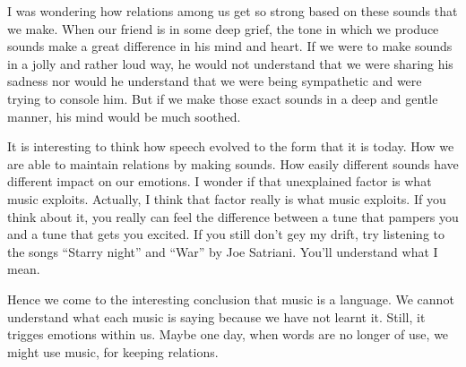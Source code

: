 \documentclass[twoside,11pt]{article}
\begin{document}
I was wondering how relations among us get so strong based on these sounds that we make. When our friend is in some deep grief, the tone in which we produce sounds make a great difference in his mind and heart. If we were to make sounds in a jolly and rather loud way, he would not understand that we were sharing his sadness nor would he understand that we were being sympathetic and were trying to console him. But if we make those exact sounds in a deep and gentle manner, his mind would be much soothed.

It is interesting to think how speech evolved to the form that it is today. How we are able to maintain relations by making sounds. How easily different sounds have different impact on our emotions. I wonder if that unexplained factor is what music exploits. Actually, I think that factor really is what music exploits. If you think about it, you really can feel the difference between a tune that pampers you and a tune that gets you excited. If you still don't gey my drift, try listening to the songs ``Starry night'' and ``War'' by Joe Satriani. You'll understand what I mean.

Hence we come to the interesting conclusion that music is a language. We cannot understand what each music is saying because we have not learnt it. Still, it trigges emotions within us. Maybe one day, when words are no longer of use, we might use music, for keeping relations.
\end{document}

